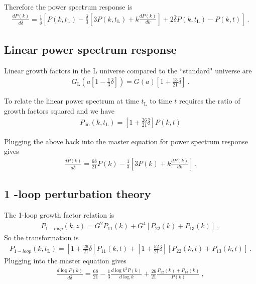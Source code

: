 Therefore the power spectrum response is 
\begin{align} 
\frac{ d P(k)}{d \bar{\delta}}=  \frac{1}{\bar{\delta} }\left[ P(k,t_\text{L}) - \frac{\bar{\delta}}{3} [ 3P(k,t_\text{L} )+ k \frac{d P(k)}{dk}] + 2 \bar{\delta} P(k, t_\text{L}) - P(k,t)\right] ~. 
\end{align} 

\subsection{Linear power spectrum response} 
Linear growth factors in the L universe compared to the ``standard" universe are 
\begin{align} 
G_\text{L}( a[ 1 - \frac{1}{3} \bar{\delta} ]) = G(a)\left[ 1 + \frac{13}{21} \bar{\delta} \right]~. 
\end{align} 

To relate the linear power spectrum at time $t_\text{L}$ to time $t$ requires the ratio of growth factors squared and we have 
\begin{align} 
P_\text{lin}(k, t_\text{L})= \left[ 1 + \frac{26}{21} \bar{\delta}\right] P(k, t) 
\end{align} 

Plugging the above back into the master equation for power spectrum response gives 
\begin{align}
\frac{ d P(k)}{d \bar{\delta}} = \frac{68}{21} P(k) - \frac{1}{3} [ 3 P(k) + k \frac{d P(k)}{dk} ] ~. 
\end{align} 

\subsection{1 -loop perturbation theory}
The 1-loop growth factor relation is 
\begin{align}
P_{1-loop}(k,z)= G^2 P_{11}(k) + G^4 [P_{22}(k) + P_{13}(k)] ~, 
\end{align} 
So the transformation is 
\begin{align} 
P_{1-loop}(k,t_\text{L})=  \left[ 1 + \frac{26}{21} \bar{\delta}\right] P_{11}(k,t) +  \left[ 1 + \frac{52}{21} \bar{\delta}\right] [ P_{22}(k,t) + P_{13}(k,t) ] ~.
\end{align} 
Plugging into the master equation gives 
\begin{align} 
\frac{ d \log P(k)}{d \bar{\delta}}=\frac{68}{21} - \frac{1}{3} \frac{ d \log k^3 P(k)}{d \log k} + \frac{26}{21} \frac{P_{22}(k) + P_{13}(k)}{P(k)} ~, 
\end{align} 


